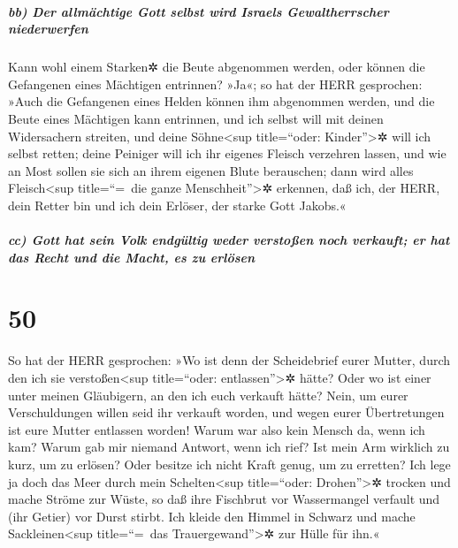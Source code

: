 \hypertarget{bb-der-allmuxe4chtige-gott-selbst-wird-israels-gewaltherrscher-niederwerfen}{%
\subparagraph{bb) Der allmächtige Gott selbst wird Israels
Gewaltherrscher
niederwerfen}\label{bb-der-allmuxe4chtige-gott-selbst-wird-israels-gewaltherrscher-niederwerfen}}

Kann wohl einem Starken✲ die Beute abgenommen werden,
oder können die Gefangenen eines Mächtigen entrinnen?
»Ja«; so hat der HERR gesprochen: »Auch die Gefangenen
eines Helden können ihm abgenommen werden, und die Beute eines Mächtigen
kann entrinnen, und ich selbst will mit deinen Widersachern streiten,
und deine Söhne\textless sup title=``oder: Kinder''\textgreater✲ will
ich selbst retten; deine Peiniger will ich ihr eigenes
Fleisch verzehren lassen, und wie an Most sollen sie sich an ihrem
eigenen Blute berauschen; dann wird alles Fleisch\textless sup
title=``=~die ganze Menschheit''\textgreater✲ erkennen, daß ich, der
HERR, dein Retter bin und ich dein Erlöser, der starke Gott Jakobs.«

\hypertarget{cc-gott-hat-sein-volk-endguxfcltig-weder-verstouxdfen-noch-verkauft-er-hat-das-recht-und-die-macht-es-zu-erluxf6sen}{%
\subparagraph{cc) Gott hat sein Volk endgültig weder verstoßen noch
verkauft; er hat das Recht und die Macht, es zu
erlösen}\label{cc-gott-hat-sein-volk-endguxfcltig-weder-verstouxdfen-noch-verkauft-er-hat-das-recht-und-die-macht-es-zu-erluxf6sen}}

\hypertarget{section-49}{%
\section{50}\label{section-49}}

So hat der HERR gesprochen: »Wo ist denn der Scheidebrief
eurer Mutter, durch den ich sie verstoßen\textless sup title=``oder:
entlassen''\textgreater✲ hätte? Oder wo ist einer unter meinen
Gläubigern, an den ich euch verkauft hätte? Nein, um eurer
Verschuldungen willen seid ihr verkauft worden, und wegen eurer
Übertretungen ist eure Mutter entlassen worden! Warum war
also kein Mensch da, wenn ich kam? Warum gab mir niemand Antwort, wenn
ich rief? Ist mein Arm wirklich zu kurz, um zu erlösen? Oder besitze ich
nicht Kraft genug, um zu erretten? Ich lege ja doch das Meer durch mein
Schelten\textless sup title=``oder: Drohen''\textgreater✲ trocken und
mache Ströme zur Wüste, so daß ihre Fischbrut vor Wassermangel verfault
und (ihr Getier) vor Durst stirbt. Ich kleide den Himmel
in Schwarz und mache Sackleinen\textless sup title=``=~das
Trauergewand''\textgreater✲ zur Hülle für ihn.«


